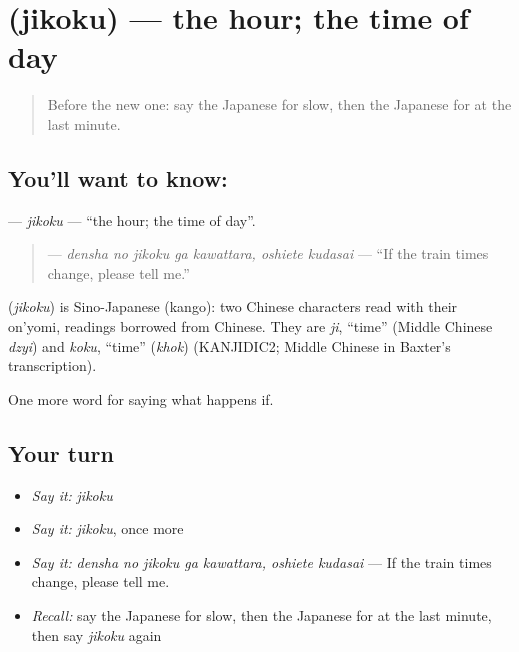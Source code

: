 \section[\texorpdfstring{\ja{じこく} (jikoku)}{じこく (jikoku)}]{ (jikoku) — the hour; the time of day}

\label{lesson:JA-C348-jikoku}



\begin{quote}
Before the new one: say the Japanese for slow, then the Japanese for at the last minute.
\end{quote}

\subsection*{You'll want to know: }
\textbf{} — \emph{jikoku} — \textquotedblleft{}the hour; the time of day\textquotedblright{}.

\begin{quote}
\textbf{   } — \emph{densha no jikoku ga kawattara, oshiete kudasai} — \textquotedblleft{}If the train times change, please tell me.\textquotedblright{}
\end{quote}

\begin{cousinweb}
\textbf{} (\emph{jikoku}) is Sino-Japanese (kango): two Chinese characters read with their on'yomi, readings borrowed from Chinese. They are \emph{ji}, \textquotedblleft{}time\textquotedblright{} (Middle Chinese \emph{dzyi}) and \emph{koku}, \textquotedblleft{}time\textquotedblright{} (\emph{khok}) (KANJIDIC2; Middle Chinese in Baxter's transcription).
\end{cousinweb}

\begin{grammarlens}[title={What you've built}]
One more word for saying what happens if.
\end{grammarlens}

\subsection*{Your turn}
\begin{itemize}
\raggedright
  \item \emph{Say it:} \emph{jikoku}
  \item \emph{Say it:} \emph{jikoku}, once more
  \item \emph{Say it:} \emph{densha no jikoku ga kawattara, oshiete kudasai} — If the train times change, please tell me.
  \item \emph{Recall:} say the Japanese for slow, then the Japanese for at the last minute, then say \emph{jikoku} again
\end{itemize}

